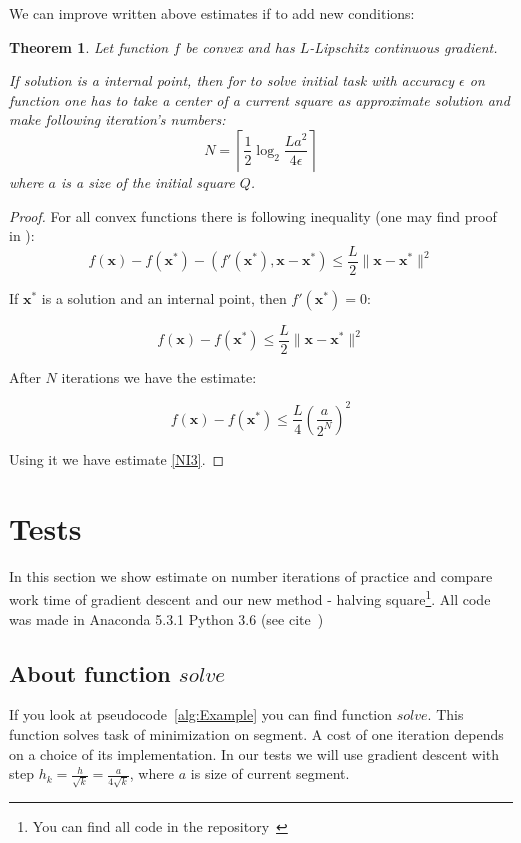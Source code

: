 \documentclass[12pt]{article}
\newtheorem{theorem}{Theorem}[section]
\begin{document}
We can improve written above estimates if to add new conditions:

\begin{theorem}
Let function $f$ be convex and has $L$-Lipschitz continuous gradient.

If solution is a internal point, then for to solve initial task with accuracy $\epsilon$ on function one has to take a center of a current square as approximate  solution and make following iteration's numbers:
\begin{equation}\label{NI3}N = \left\lceil\frac{1}{2}\log_2\frac{La^2}{4\epsilon}\right\rceil\end{equation}
where $a$ is a size of the initial square $Q$.
\end{theorem}

\begin{proof}
For all convex functions there is following inequality (one may find proof in \cite{Nesterov}):
$$f(\textbf{x}) - f(\textbf{x}^*) - (f'(\textbf{x}^*), \textbf{x} - \textbf{x}^*) \leq \frac{L}{2}\|\textbf{x}-\textbf{x}^*\|^2$$

If $\textbf{x}^*$ is a solution and an internal point, then $f'(\textbf{x}^*) = 0$:

$$f(\textbf{x}) - f(\textbf{x}^*)\leq \frac{L}{2}\|\textbf{x}-\textbf{x}^*\|^2$$

After $N$ iterations we have the estimate:

$$f(\textbf{x}) - f(\textbf{x}^*)\leq \frac{L}{4}\left(\frac{a}{2^N}\right)^2$$

Using it we have estimate \eqref{NI3}.
\end{proof}

\section{Tests}

In this section we show estimate on number iterations of practice and compare work time of gradient descent and our new method - halving square\footnote{You can find all code in the repository~\cite{my_git}}. All code was made in Anaconda 5.3.1 Python 3.6 (see cite~\cite{conda})

\subsection{About function $solve$}

If you look at pseudocode~\ref{alg:Example} you can find function $solve$. This function solves task of minimization on segment. A cost of one iteration depends on a choice of its implementation. In our tests we will use gradient descent with step $h_k = \frac{h}{\sqrt{k}} = \frac{a}{4\sqrt{k}}$, where $a$ is size of current segment.
\end{document}
